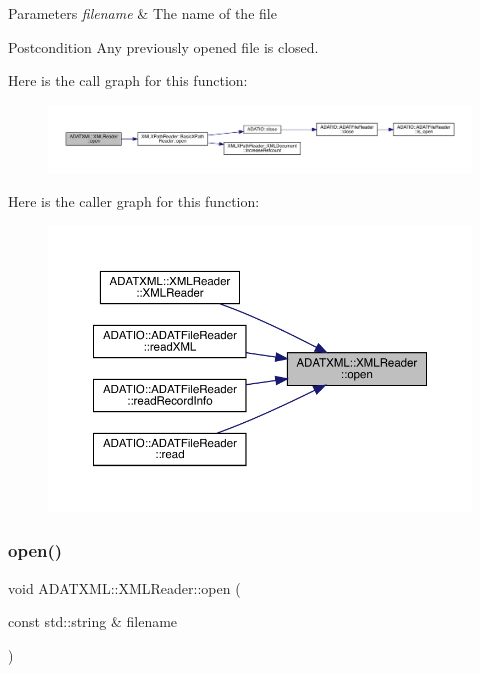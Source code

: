 \begin{DoxyParams}{Parameters}
{\em filename} & The name of the file \\
\hline
\end{DoxyParams}
\begin{DoxyPostcond}{Postcondition}
Any previously opened file is closed. 
\end{DoxyPostcond}
Here is the call graph for this function\+:
\nopagebreak
\begin{figure}[H]
\begin{center}
\leavevmode
\includegraphics[width=350pt]{db/d3f/classADATXML_1_1XMLReader_ad5dcbd08800bc67ac4a91f93cb1504b0_cgraph}
\end{center}
\end{figure}
Here is the caller graph for this function\+:
\nopagebreak
\begin{figure}[H]
\begin{center}
\leavevmode
\includegraphics[width=350pt]{db/d3f/classADATXML_1_1XMLReader_ad5dcbd08800bc67ac4a91f93cb1504b0_icgraph}
\end{center}
\end{figure}
\mbox{\label{classADATXML_1_1XMLReader_ad5dcbd08800bc67ac4a91f93cb1504b0}} 
\subsubsection{\texorpdfstring{open()}{open()}\hspace{0.1cm}{\footnotesize\ttfamily [2/9]}}
{\footnotesize\ttfamily void A\+D\+A\+T\+X\+M\+L\+::\+X\+M\+L\+Reader\+::open (\begin{DoxyParamCaption}\item[{const std\+::string \&}]{filename }\end{DoxyParamCaption})\hspace{0.3cm}{\ttfamily [inline]}}



